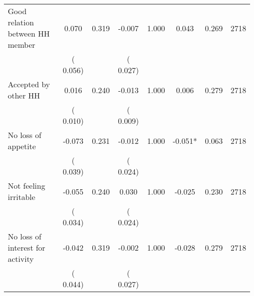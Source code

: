 \begin{tabular}{l*{7}{c}}
 Good relation between HH member       &              0.070       &        0.319  &             -0.007       &        1.000  &              0.043       &              0.269 &  2718 \\ 
                       &       (       0.056)             &                               &       (       0.027)                     &                               &                                               &                                &                      \\ 

 Accepted by other HH       &              0.016       &        0.240  &             -0.013       &        1.000  &              0.006       &              0.279 &  2718 \\ 
                       &       (       0.010)             &                               &       (       0.009)                     &                               &                                               &                                &                      \\ 

 No loss of appetite       &             -0.073       &        0.231  &             -0.012       &        1.000  &             -0.051*       &              0.063 &  2718 \\ 
                       &       (       0.039)             &                               &       (       0.024)                     &                               &                                               &                                &                      \\ 

 Not feeling irritable       &             -0.055       &        0.240  &              0.030       &        1.000  &             -0.025       &              0.230 &  2718 \\ 
                       &       (       0.034)             &                               &       (       0.024)                     &                               &                                               &                                &                      \\ 

 No loss of interest for activity       &             -0.042       &        0.319  &             -0.002       &        1.000  &             -0.028       &              0.279 &  2718 \\ 
                       &       (       0.044)             &                               &       (       0.027)                     &                               &                                               &                                &                      \\ 


\end{tabular}
